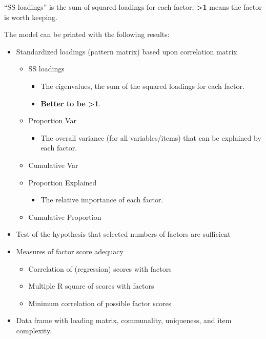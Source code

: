 \documentclass[
]{ctexart}
\providecommand{\tightlist}{%
  \setlength{\itemsep}{0pt}\setlength{\parskip}{0pt}}
\begin{document}
``SS loadings'' is the sum of squared loadings for each factor;
\textbf{\textgreater1} means the factor is worth keeping.

The model can be printed with the following results:

\begin{itemize}
\tightlist
\item
  Standardized loadings (pattern matrix) based upon correlation matrix

  \begin{itemize}
  \tightlist
  \item
    SS loadings

    \begin{itemize}
    \tightlist
    \item
      The eigenvalues, the sum of the squared loadings for each factor.
    \item
      \textbf{Better to be \textgreater1}.
    \end{itemize}
  \item
    Proportion Var

    \begin{itemize}
    \tightlist
    \item
      The overall variance (for all variables/items) that can be
      explained by each factor.
    \end{itemize}
  \item
    Cumulative Var
  \item
    Proportion Explained

    \begin{itemize}
    \tightlist
    \item
      The relative importance of each factor.
    \end{itemize}
  \item
    Cumulative Proportion
  \end{itemize}
\item
  Test of the hypothesis that selected numbers of factors are sufficient
\item
  Measures of factor score adequacy

  \begin{itemize}
  \tightlist
  \item
    Correlation of (regression) scores with factors
  \item
    Multiple R square of scores with factors
  \item
    Minimum correlation of possible factor scores
  \end{itemize}
\item
  Data frame with loading matrix, communality, uniqueness, and item
  complexity.
\end{itemize}
\end{document}
